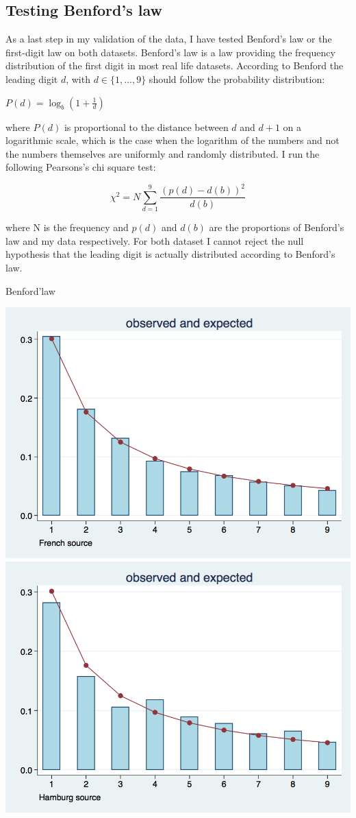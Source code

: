 \documentclass[12pt,a4paper,titlepage,english]{article}
\begin{document}
\subsection{Testing Benford’s law}
As a last step in my validation of the data, I have tested Benford’s law or the first-digit law on both datasets. Benford’s law is a law providing the frequency distribution of the first digit in most real life datasets. According to Benford the leading digit $d$, with $d \in \{1,...,9\}$ should follow the probability distribution: 
\begin{center}
$P(d)=\log_b(1+\frac{1}{d})$
\end{center}
where $P(d)$ is proportional to the distance between $d$ and $d+1$ on a logarithmic scale, which is the case when the logarithm of the numbers and not the numbers themselves are uniformly and randomly distributed. I run the following Pearsons’s chi square test:
\begin{center}
$$\chi^2=N\sum_{d=1}^{9}\frac{(p(d)-d(b))^2}{d(b)}$$
\end{center}
where N is the frequency and $p(d)$ and $d(b)$ are the proportions of Benford’s law and my data respectively. For both dataset I cannot reject the null hypothesis that the leading digit is actually distributed according to Benford’s law.
\caption{Benford'law}
\includegraphics[scale=.28]{benford_fr.png}
\includegraphics[scale=.28]{benford_hb.png}
\end{document}
